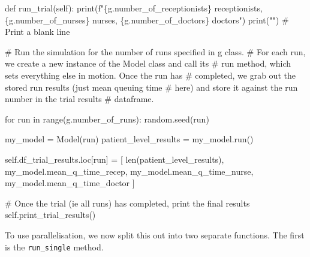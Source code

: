 \documentclass[
  letterpaper,
  DIV=11,
  numbers=noendperiod]{scrreprt}
\newenvironment{Shaded}{\begin{snugshade}}{\end{snugshade}}
\newcommand{\BuiltInTok}[1]{\textcolor[rgb]{0.00,0.23,0.31}{#1}}
\newcommand{\CommentTok}[1]{\textcolor[rgb]{0.37,0.37,0.37}{#1}}
\newcommand{\ControlFlowTok}[1]{\textcolor[rgb]{0.00,0.23,0.31}{#1}}
\newcommand{\KeywordTok}[1]{\textcolor[rgb]{0.00,0.23,0.31}{#1}}
\newcommand{\NormalTok}[1]{\textcolor[rgb]{0.00,0.23,0.31}{#1}}
\newcommand{\OperatorTok}[1]{\textcolor[rgb]{0.37,0.37,0.37}{#1}}
\newcommand{\SpecialCharTok}[1]{\textcolor[rgb]{0.37,0.37,0.37}{#1}}
\newcommand{\SpecialStringTok}[1]{\textcolor[rgb]{0.13,0.47,0.30}{#1}}
\newcommand{\StringTok}[1]{\textcolor[rgb]{0.13,0.47,0.30}{#1}}
\newcommand{\VariableTok}[1]{\textcolor[rgb]{0.07,0.07,0.07}{#1}}
\begin{document}
\begin{Shaded}
\begin{Highlighting}[]
\KeywordTok{def}\NormalTok{ run\_trial(}\VariableTok{self}\NormalTok{):}
        \BuiltInTok{print}\NormalTok{(}\SpecialStringTok{f"}\SpecialCharTok{\{}\NormalTok{g}\SpecialCharTok{.}\NormalTok{number\_of\_receptionists}\SpecialCharTok{\}}\SpecialStringTok{ receptionists, }\SpecialCharTok{\{}\NormalTok{g}\SpecialCharTok{.}\NormalTok{number\_of\_nurses}\SpecialCharTok{\}}\SpecialStringTok{ nurses, }\SpecialCharTok{\{}\NormalTok{g}\SpecialCharTok{.}\NormalTok{number\_of\_doctors}\SpecialCharTok{\}}\SpecialStringTok{ doctors"}\NormalTok{)}
        \BuiltInTok{print}\NormalTok{(}\StringTok{""}\NormalTok{) }\CommentTok{\# Print a blank line}

        \CommentTok{\# Run the simulation for the number of runs specified in g class.}
        \CommentTok{\# For each run, we create a new instance of the Model class and call its}
        \CommentTok{\# run method, which sets everything else in motion.  Once the run has}
        \CommentTok{\# completed, we grab out the stored run results (just mean queuing time}
        \CommentTok{\# here) and store it against the run number in the trial results}
        \CommentTok{\# dataframe.}

        \ControlFlowTok{for}\NormalTok{ run }\KeywordTok{in} \BuiltInTok{range}\NormalTok{(g.number\_of\_runs):}
\NormalTok{            random.seed(run)}

\NormalTok{            my\_model }\OperatorTok{=}\NormalTok{ Model(run)}
\NormalTok{            patient\_level\_results }\OperatorTok{=}\NormalTok{ my\_model.run()}

            \VariableTok{self}\NormalTok{.df\_trial\_results.loc[run] }\OperatorTok{=}\NormalTok{ [}
                \BuiltInTok{len}\NormalTok{(patient\_level\_results),}
\NormalTok{                my\_model.mean\_q\_time\_recep,}
\NormalTok{                my\_model.mean\_q\_time\_nurse,}
\NormalTok{                my\_model.mean\_q\_time\_doctor}
\NormalTok{                ]}

        \CommentTok{\# Once the trial (ie all runs) has completed, print the final results}
        \VariableTok{self}\NormalTok{.print\_trial\_results()}
\end{Highlighting}
\end{Shaded}

To use parallelisation, we now split this out into two separate
functions. The first is the \texttt{run\_single} method.
\end{document}
